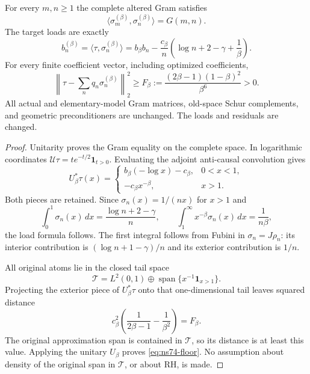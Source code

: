 \begin{proposition}
\label{prop:ns74-same-gram}
For every $m,n\geq1$ the complete altered Gram satisfies
\[
 \langle\sigma_m^{(\beta)},\sigma_n^{(\beta)}\rangle=G(m,n).
\]
The target loads are exactly
\begin{equation}
 b_n^{(\beta)}=\langle\tau,\sigma_n^{(\beta)}\rangle
 =b_\beta b_n-\frac{c_\beta}{n}
                    \left(\log n+2-\gamma+\frac1\beta\right).
 \label{eq:ns74-loads}
\end{equation}
For every finite coefficient vector, including optimized coefficients,
\begin{equation}
 \left\|\tau-\sum_n q_n\sigma_n^{(\beta)}\right\|_2^2
 \geq F_\beta:=\frac{(2\beta-1)(1-\beta)^2}{\beta^6}>0.
 \label{eq:ns74-floor}
\end{equation}
All actual and elementary-model Gram matrices, old-space Schur
complements, and geometric preconditioners are unchanged. The loads
and residuals are changed.
\end{proposition}
\begin{proof}
Unitarity proves the Gram equality on the complete space. In logarithmic
coordinates $\mathcal U\tau=t e^{-t/2}\mathbf1_{t>0}$.
Evaluating the adjoint anti-causal convolution gives
\[
 U_\beta^*\tau(x)=
 \begin{cases}
 b_\beta(-\log x)-c_\beta,&0<x<1,\\
 -c_\beta x^{-\beta},&x>1.
 \end{cases}
\]
Both pieces are retained. Since $\sigma_n(x)=1/(nx)$ for $x>1$ and
\[
 \int_0^1\sigma_n(x)\,dx=\frac{\log n+2-\gamma}{n},
 \qquad \int_1^\infty x^{-\beta}\sigma_n(x)\,dx=\frac1{n\beta},
\]
the load formula follows. The first integral follows from Fubini in
$\sigma_n=J\rho_n$: its interior contribution is
$(\log n+1-\gamma)/n$ and its exterior contribution is $1/n$.

All original atoms lie in the closed tail space
\[
 \mathcal T=L^2(0,1)\oplus
              \operatorname{span}\{x^{-1}\mathbf1_{x>1}\}.
\]
Projecting the exterior piece of $U_\beta^*\tau$ onto that one-dimensional
tail leaves squared distance
\[
 c_\beta^2\left(\frac1{2\beta-1}-\frac1{\beta^2}\right)
 =F_\beta.
\]
The original approximation span is contained in $\mathcal T$, so its
distance is at least this value. Applying the unitary $U_\beta$ proves
\eqref{eq:ns74-floor}. No assumption about density of the original span
in $\mathcal T$, or about RH, is made.
\end{proof}

